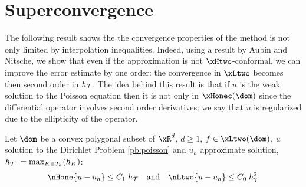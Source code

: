 \section{Superconvergence}

The following result shows the the convergence properties of the method is not only limited by interpolation inequalities.
Indeed, using a result by Aubin and Nitsche, we show that even if the approximation is not $\xHtwo$-conformal, we can improve the error estimate by one order: the convergence in $\xLtwo$ becomes then second order in $h_{\mathcal T}$.
The idea behind this result is that if $u$ is the weak solution to the Poisson equation then it is not only in $\xHonec(\dom)$ since the differential operator involves second order derivatives: we say that $u$ is regularized due to the ellipticity of the operator.

\begin{thrm}[Superconvergence]
Let $\dom$ be a convex polygonal subset of $\xR^d$, $d \geq 1$, $f \in \xLtwo(\dom)$, $u$ solution to the Dirichlet Problem \eqref{pb:poisson} and $u_h$ approximate solution, $h_{\mathcal T}\;= \max_{K\in{\mathcal T}_h}(h_K)$:
\begin{equation*}
\nHone{u - u_h}  \leq C_1\;\sizeT\quad\mbox{and}\quad\nLtwo{u - u_h}  \leq C_0\;\sizeT^2
\end{equation*}
\end{thrm}

